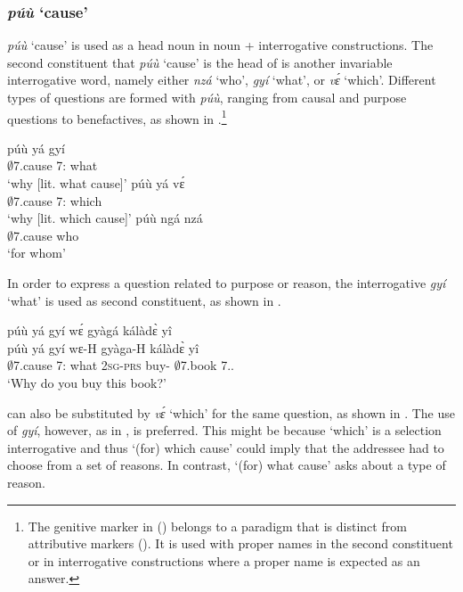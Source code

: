 \subsubsection{{\itshape púù} `cause'}
\label{sec:puu}

{\itshape púù} `cause' is used as a head noun in noun + interrogative constructions. The second constituent that {\itshape púù} `cause' is the head of is another invariable interrogative word, namely either {\itshape nzá} `who', {\itshape gyí} `what', or {\itshape vɛ́} `which'. Different types of questions are formed with {\itshape púù},  ranging from causal and purpose questions to  benefactives, as shown in .\footnote{The genitive marker in  () belongs to a paradigm that is distinct from attributive markers (). It is used with proper names in the second constituent or in interrogative constructions where a proper name is expected as an answer.}

\ea \label{puux}
  \ea  \label{puux1}
  \gll  púù yá gyí \\
         $\emptyset$7.cause 7:{\ATT} what\\
    \trans `why [lit. what cause]'
  \ex  \label{puux2}
  \gll  púù yá vɛ́ \\
         $\emptyset$7.cause 7:{\ATT} which\\
    \trans `why [lit. which cause]'
  \ex  \label{puux3}
  \gll  púù ngá nzá \\
         $\emptyset$7.cause {\GEN} who\\
    \trans `for whom'    
\z
\z
 

In order to express a question related to purpose or reason, the interrogative {\itshape gyí} `what' is used as second constituent, as shown in .

\ea\label{puuyagyi}
 \glll  púù yá gyí wɛ́ gyàgá kálàdɛ̀ yî \\
    púù yá gyí wɛ-H gyàga-H kálàdɛ̀ yî \\
$\emptyset$7.cause 7:{\ATT} what 2\textsc{sg}-\textsc{prs} buy-{\R} $\emptyset$7.book 7.{\DEM}.{\PROX}  \\
    \trans `Why do you buy this book?'
\z

 can also be substituted by {\itshape vɛ́} `which' for the same question, as shown in . The use of {\itshape gyí}, however, as in , is preferred. This might be because `which' is a selection interrogative and thus `(for) which cause' could imply that the addressee had to choose from a set of reasons. In contrast, `(for) what cause' asks about a type of reason.


